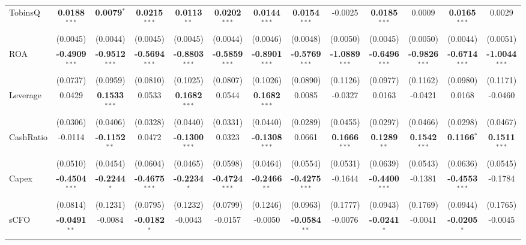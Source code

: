 \begin{landscape}
\begin{table}[H]
\begin{tabular}{lcccccccccccc}
TobinsQ & \textbf{0.0188}$^{***}$ & \textbf{0.0079}$^{*}$ & \textbf{0.0215}$^{***}$ & \textbf{0.0113}$^{**}$ & \textbf{0.0202}$^{***}$ & \textbf{0.0144}$^{***}$ & \textbf{0.0154}$^{***}$ & -0.0025 & \textbf{0.0185}$^{***}$ & 0.0009 & \textbf{0.0165}$^{***}$ & 0.0029 \\
 & (0.0045) & (0.0044) & (0.0045) & (0.0045) & (0.0044) & (0.0046) & (0.0048) & (0.0050) & (0.0045) & (0.0050) & (0.0044) & (0.0051) \\
ROA & \textbf{-0.4909}$^{***}$ & \textbf{-0.9512}$^{***}$ & \textbf{-0.5694}$^{***}$ & \textbf{-0.8803}$^{***}$ & \textbf{-0.5859}$^{***}$ & \textbf{-0.8901}$^{***}$ & \textbf{-0.5769}$^{***}$ & \textbf{-1.0889}$^{***}$ & \textbf{-0.6496}$^{***}$ & \textbf{-0.9826}$^{***}$ & \textbf{-0.6714}$^{***}$ & \textbf{-1.0044}$^{***}$ \\
 & (0.0737) & (0.0959) & (0.0810) & (0.1025) & (0.0807) & (0.1026) & (0.0890) & (0.1126) & (0.0977) & (0.1162) & (0.0980) & (0.1171) \\
Leverage & 0.0429 & \textbf{0.1533}$^{***}$ & 0.0533 & \textbf{0.1682}$^{***}$ & 0.0544 & \textbf{0.1682}$^{***}$ & 0.0085 & -0.0327 & 0.0163 & -0.0421 & 0.0168 & -0.0460 \\
 & (0.0306) & (0.0406) & (0.0328) & (0.0440) & (0.0331) & (0.0440) & (0.0289) & (0.0455) & (0.0297) & (0.0466) & (0.0298) & (0.0467) \\
CashRatio & -0.0114 & \textbf{-0.1152}$^{**}$ & 0.0472 & \textbf{-0.1300}$^{***}$ & 0.0323 & \textbf{-0.1308}$^{***}$ & 0.0661 & \textbf{0.1666}$^{***}$ & \textbf{0.1289}$^{**}$ & \textbf{0.1542}$^{***}$ & \textbf{0.1166}$^{*}$ & \textbf{0.1511}$^{***}$ \\
 & (0.0510) & (0.0454) & (0.0604) & (0.0465) & (0.0598) & (0.0464) & (0.0554) & (0.0531) & (0.0639) & (0.0543) & (0.0636) & (0.0545) \\
Capex & \textbf{-0.4504}$^{***}$ & \textbf{-0.2244}$^{*}$ & \textbf{-0.4675}$^{***}$ & \textbf{-0.2234}$^{*}$ & \textbf{-0.4724}$^{***}$ & \textbf{-0.2466}$^{**}$ & \textbf{-0.4275}$^{***}$ & -0.1644 & \textbf{-0.4400}$^{***}$ & -0.1381 & \textbf{-0.4553}$^{***}$ & -0.1784 \\
 & (0.0814) & (0.1231) & (0.0795) & (0.1232) & (0.0799) & (0.1246) & (0.0963) & (0.1777) & (0.0943) & (0.1769) & (0.0944) & (0.1765) \\
sCFO & \textbf{-0.0491}$^{**}$ & -0.0084 & \textbf{-0.0182}$^{*}$ & -0.0043 & -0.0157 & -0.0050 & \textbf{-0.0584}$^{**}$ & -0.0076 & \textbf{-0.0241}$^{*}$ & -0.0041 & \textbf{-0.0205}$^{*}$ & -0.0045 \\

\end{tabular}
\end{table}
\end{landscape}

